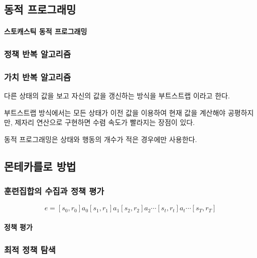 \documentclass [12pt] {oblivoir}
\let\oldsubsubsection=\subsubsection
\renewcommand{\subsubsection}
{
  \filbreak
  \oldsubsubsection
}
\begin{document}
\subsection{동적 프로그래밍}

\paragraph*{스토캐스틱 동적 프로그래밍}\mbox{}

\vspace{3mm}

\subsubsection{정책 반복 알고리즘}

\subsubsection{가치 반복 알고리즘}

다른 상태의 값을 보고 자신의 값을 갱신하는 방식을 부트스트랩 이라고 한다.

부트스트랩 방식에서는 모든 상태가 이전 값을 이용하여 현재 값을 계산해야 공평하지만, 제자리 연산으로 구현하면 수렴 속도가 빨라지는 장점이 있다.

동적 프로그래밍은 상태와 행동의 개수가 적은 경우에만 사용한다.

\subsection{몬테카를로 방법}

\subsubsection{훈련집합의 수집과 정책 평가}

\begin{equation} \tag{9.20}
  e = [s_{0}, r_{0}]a_{0}[s_{1}, r_{1}]a_{1}[s_{2}, r_{2}]a_{2} \cdots [s_{t}, r_{t}]a_{t} \cdots [s_{T}, r_{T}]
\end{equation}

\paragraph*{정책 평가}\mbox{}

\vspace{3mm}

\subsubsection{최적 정책 탐색}
\end{document}

